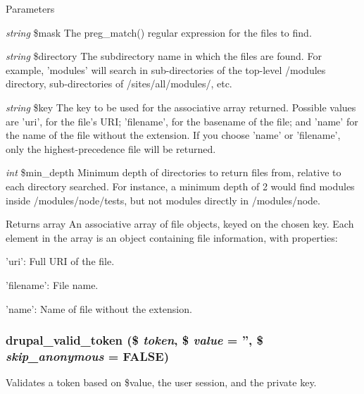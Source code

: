 \begin{DoxyParams}{Parameters}
\item[{\em string}]\$mask The preg\_\-match() regular expression for the files to find. \item[{\em string}]\$directory The subdirectory name in which the files are found. For example, 'modules' will search in sub-\/directories of the top-\/level /modules directory, sub-\/directories of /sites/all/modules/, etc. \item[{\em string}]\$key The key to be used for the associative array returned. Possible values are 'uri', for the file's URI; 'filename', for the basename of the file; and 'name' for the name of the file without the extension. If you choose 'name' or 'filename', only the highest-\/precedence file will be returned. \item[{\em int}]\$min\_\-depth Minimum depth of directories to return files from, relative to each directory searched. For instance, a minimum depth of 2 would find modules inside /modules/node/tests, but not modules directly in /modules/node.\end{DoxyParams}
\begin{DoxyReturn}{Returns}
array An associative array of file objects, keyed on the chosen key. Each element in the array is an object containing file information, with properties:
\begin{DoxyItemize}
\item 'uri': Full URI of the file.
\item 'filename': File name.
\item 'name': Name of file without the extension. 
\end{DoxyItemize}
\end{DoxyReturn}
\hypertarget{common_8inc_a343a6ad44cfc1007b618b245f9366be8}{
\subsubsection[{drupal\_\-valid\_\-token}]{\setlength{\rightskip}{0pt plus 5cm}drupal\_\-valid\_\-token (\$ {\em token}, \/  \$ {\em value} = {\ttfamily ''}, \/  \$ {\em skip\_\-anonymous} = {\ttfamily FALSE})}}
\label{common_8inc_a343a6ad44cfc1007b618b245f9366be8}
Validates a token based on \$value, the user session, and the private key.


